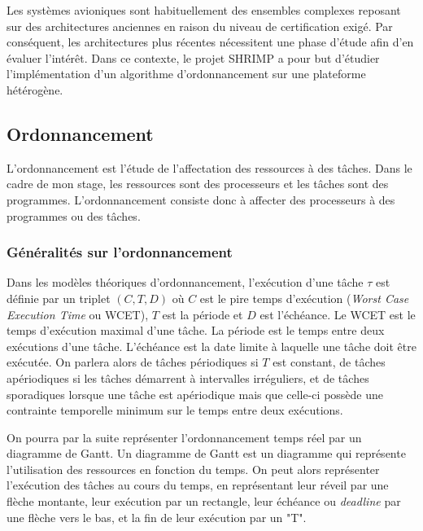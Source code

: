 Les systèmes avioniques sont habituellement des ensembles complexes reposant sur des architectures anciennes en raison du niveau de certification exigé. Par conséquent, les architectures plus récentes nécessitent une phase d'étude afin d'en évaluer l'intérêt. Dans ce contexte, le projet SHRIMP a pour but d'étudier l'implémentation d'un algorithme d'ordonnancement sur une plateforme hétérogène.   

\subsection{Ordonnancement}

L'ordonnancement est l'étude de l'affectation des ressources à des tâches. Dans le cadre de mon stage, les ressources sont des processeurs et les tâches sont des programmes. L'ordonnancement consiste donc à affecter des processeurs à des programmes ou des tâches.

\subsubsection{Généralités sur l'ordonnancement}

Dans les modèles théoriques d'ordonnancement, l'exécution d'une tâche $\tau$ est définie par un triplet $(C,T,D)$ où $C$ est le pire temps d'exécution (\textit{Worst Case Execution Time} ou WCET), $T$ est la période et $D$ est l'échéance. Le WCET est le temps d'exécution maximal d'une tâche. La période est le temps entre deux exécutions d'une tâche. L'échéance est la date limite à laquelle une tâche doit être exécutée. On parlera alors de tâches périodiques si $T$ est constant, de tâches apériodiques si les tâches démarrent à intervalles irréguliers, et de tâches sporadiques lorsque une tâche est apériodique mais que celle-ci   possède une contrainte temporelle minimum sur le temps entre deux exécutions.

On pourra par la suite représenter l'ordonnancement temps réel par un diagramme de Gantt. Un diagramme de Gantt est un diagramme qui représente l'utilisation des ressources en fonction du temps. On peut alors représenter l'exécution des tâches au cours du temps, en représentant leur réveil par une flèche montante, leur exécution par un rectangle, leur échéance ou \textit{deadline} par une flèche vers le bas, et la fin de leur exécution par un "T". 

